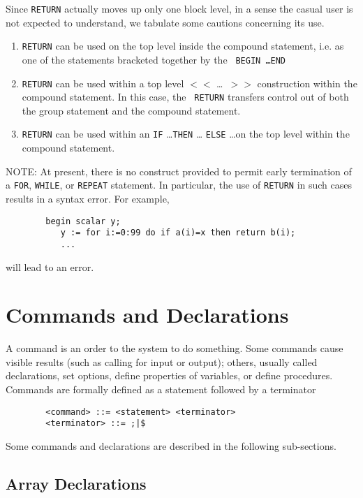 Since {\tt RETURN} actually moves up only one
block level, in a sense the casual user is not expected to
understand, we tabulate some cautions concerning its use.
\begin{enumerate}
\item {\tt RETURN} can be used on the top level inside the compound
statement, i.e. as one of the statements bracketed together by the {\tt
BEGIN \ldots END}

\item {\tt RETURN} can be used within a top level {\tt $<<$} \ldots {\tt
$>>$} construction within the compound statement.  In this case, the {\tt
RETURN} transfers control out of both the group statement and the compound
statement.

\item {\tt RETURN} can be used within an {\tt IF} \ldots {\tt THEN} \ldots
{\tt ELSE} \ldots on the top level within the compound statement.
\end{enumerate}
NOTE:  At present, there is no construct provided to permit early
termination of a {\tt FOR}, {\tt WHILE},
or {\tt REPEAT} statement.  In particular, the use of
{\tt RETURN} in such cases results in a syntax error.  For example,
\begin{verbatim}
        begin scalar y;
           y := for i:=0:99 do if a(i)=x then return b(i);
           ...
\end{verbatim}
will lead to an error.

\chapter{Commands and Declarations}

A command is an order to the system to do something.  Some
commands cause visible results (such as calling for input or output);
others, usually called declarations, set options,
define properties of variables, or define procedures.  Commands are
formally defined as a statement followed by a terminator
\begin{verbatim}
        <command> ::= <statement> <terminator>
        <terminator> ::= ;|$
\end{verbatim}
Some {\REDUCE} commands and declarations are described in the following
sub-sections.

\section{Array Declarations}

